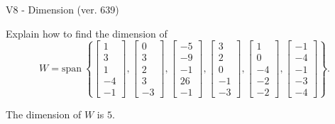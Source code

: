 \begin{exercise}
  \begin{exerciseTitle}V8 - Dimension (ver. 639)\end{exerciseTitle}
  \begin{exerciseStatement}
    Explain how to find the dimension of 
\[W=\mathrm{span}\ \left\{\left[\begin{array}{r}
1 \\
3 \\
1 \\
-4 \\
-1
\end{array}\right] , \left[\begin{array}{r}
0 \\
3 \\
2 \\
3 \\
-3
\end{array}\right] , \left[\begin{array}{r}
-5 \\
-9 \\
-1 \\
26 \\
-1
\end{array}\right] , \left[\begin{array}{r}
3 \\
2 \\
0 \\
-1 \\
-3
\end{array}\right] , \left[\begin{array}{r}
1 \\
0 \\
-4 \\
-2 \\
-2
\end{array}\right] , \left[\begin{array}{r}
-1 \\
-4 \\
-1 \\
-3 \\
-4
\end{array}\right]\right\}.\]



  \end{exerciseStatement}
  \begin{exerciseAnswer}
   The dimension of \(W\) is  \(5\).
  


  \end{exerciseAnswer}
\end{exercise}